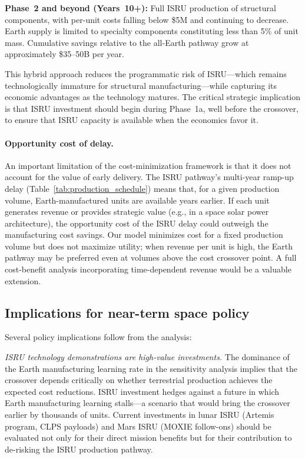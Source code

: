 \documentclass[preprint,12pt]{elsarticle}
\begin{document}
\textbf{Phase~2 and beyond (Years~10+):} Full ISRU production of structural components, with per-unit costs falling below \$5M and continuing to decrease. Earth supply is limited to specialty components constituting less than 5\% of unit mass. Cumulative savings relative to the all-Earth pathway grow at approximately \$35--50B per year.

This hybrid approach reduces the programmatic risk of ISRU---which remains technologically immature for structural manufacturing---while capturing its economic advantages as the technology matures. The critical strategic implication is that ISRU investment should begin during Phase~1a, well before the crossover, to ensure that ISRU capacity is available when the economics favor it.

\paragraph{Opportunity cost of delay.} An important limitation of the cost-minimization framework is that it does not account for the value of early delivery. The ISRU pathway's multi-year ramp-up delay (Table~\ref{tab:production_schedule}) means that, for a given production volume, Earth-manufactured units are available years earlier. If each unit generates revenue or provides strategic value (e.g., in a space solar power architecture), the opportunity cost of the ISRU delay could outweigh the manufacturing cost savings. Our model minimizes cost for a fixed production volume but does not maximize utility; when revenue per unit is high, the Earth pathway may be preferred even at volumes above the cost crossover point. A full cost-benefit analysis incorporating time-dependent revenue would be a valuable extension.

\subsection{Implications for near-term space policy}

Several policy implications follow from the analysis:

\emph{ISRU technology demonstrations are high-value investments.} The dominance of the Earth manufacturing learning rate in the sensitivity analysis implies that the crossover depends critically on whether terrestrial production achieves the expected cost reductions. ISRU investment hedges against a future in which Earth manufacturing learning stalls---a scenario that would bring the crossover earlier by thousands of units. Current investments in lunar ISRU (Artemis program, CLPS payloads) and Mars ISRU (MOXIE follow-ons) should be evaluated not only for their direct mission benefits but for their contribution to de-risking the ISRU production pathway.
\end{document}

